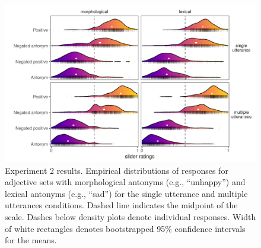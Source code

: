 \documentclass[floatsintext,doc]{apa6}
\begin{document}
\begin{figure}[t]
\centering \includegraphics[width=0.95\linewidth]{figs/expt2_ridges_wCIs} 
\caption{Experiment 2 results. Empirical distributions of responses for adjective sets with morphological antonyms (e.g., ``unhappy'') and lexical antonyms (e.g., ``sad'') for the single utterance and multiple utterances conditions. Dashed line indicates the midpoint of the scale. Dashes below density plots denote individual responses. Width of white rectangles denotes bootstrapped 95\% confidence intervals for the means.}
\label{fig:expt2-results}
\end{figure}
\end{document}
